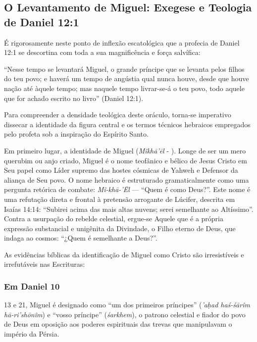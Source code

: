 \subsection{O Levantamento de Miguel: Exegese e Teologia de Daniel 12:1}


É rigorosamente neste ponto de inflexão escatológica que a profecia de Daniel 12:1 se descortina com toda a sua magnificência e força salvífica:

``Nesse tempo se levantará Miguel, o grande príncipe que se levanta pelos filhos do teu povo; e haverá um tempo de angústia qual nunca houve, desde que houve nação até àquele tempo; mas naquele tempo livrar-se-á o teu povo, todo aquele que for achado escrito no livro'' (Daniel 12:1).

Para compreender a densidade teológica deste oráculo, torna-se imperativo dissecar a identidade da figura central e os termos técnicos hebraicos empregados pelo profeta sob a inspiração do Espírito Santo.

Em primeiro lugar, a identidade de Miguel (\textit{Mîkhā’ēl} - ). Longe de ser um mero querubim ou anjo criado, Miguel é o nome teofânico e bélico de Jesus Cristo em Seu papel como Líder supremo das hostes cósmicas de Yahweh e Defensor da aliança de Seu povo. O nome hebraico é estruturado gramaticalmente como uma pergunta retórica de combate: \textit{Mî-khā-’Ēl} — ``Quem é como Deus?''. Este nome é uma refutação direta e frontal à pretensão arrogante de Lúcifer, descrita em Isaías 14:14: ``Subirei acima das mais altas nuvens; serei semelhante ao Altíssimo''. Contra a usurpação do rebelde celestial, ergue-se Aquele que é a própria expressão substancial e unigênita da Divindade, o Filho eterno de Deus, que indaga ao cosmos: ``¿Quem é semelhante a Deus?''.

As evidências bíblicas da identificação de Miguel como Cristo são irresistíveis e irrefutáveis nas Escrituras:

\subsubsection*{Em Daniel 10}
13 e 21, Miguel é designado como ``um dos primeiros príncipes'' (\textit{’aḥad haś-śārîm hā-ri’shōnîm}) e ``vosso príncipe'' (\textit{śarkhem}), o patrono celestial e fiador do povo de Deus em oposição aos poderes espirituais das trevas que manipulavam o império da Pérsia.

